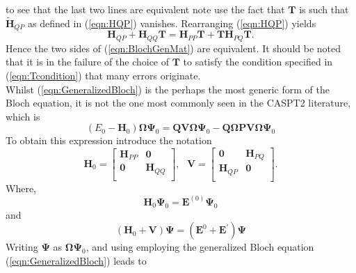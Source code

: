 \documentclass[12pt]{article}
\begin{document}
to see that the last two lines are equivalent note use the fact that $\mathbf{T}$ is such that $\tilde{\mathbf{H}}_{QP}$ 
as defined in (\ref{eqn:HQP}) vanishes. Rearranging (\ref{eqn:HQP}) yields 
\begin{equation*}
\mathbf{H}_{QP} + \mathbf{H}_{QQ}\mathbf{T} = \mathbf{\mathbf{H}}_{PP}\mathbf{T} + \mathbf{T}\mathbf{H}_{PQ}\mathbf{T}.
\label{eqn:Tcondition}
\end{equation*}
Hence the two sides of (\ref{eqn:BlochGenMat}) are equivalent. It should be noted that it is in the 
failure of the choice of $\mathbf{T}$ to satisfy the condition specified in (\ref{eqn:Tcondition}) 
that many errors originate.\\

\noindent Whilst (\ref{eqn:GeneralizedBloch}) is the perhaps the most generic form of the Bloch equation,
it is not the one most commonly seen in the CASPT2 literature, which is 
\begin{equation}
(E_{0} - \mathbf{H}_{0})\mathbf{\Omega} \boldsymbol{\Psi}_{0} =
 \mathbf{Q}\mathbf{V}\boldsymbol{\Omega}\boldsymbol{\Psi}_{0}- 
 \mathbf{Q}\boldsymbol{\Omega}\mathbf{P}\mathbf{V}\boldsymbol{\Omega}\boldsymbol{\Psi}_{0} 
\end{equation}
To obtain this expression introduce the notation
\begin{equation}
\mathbf{H}_{0}=
\begin{bmatrix}
\mathbf{H}_{PP} & \mathbf{0} \\
\mathbf{0} & \mathbf{H}_{QQ} \\
\end{bmatrix},
\text{ \ \ \ \ }
\mathbf{V} =
\begin{bmatrix}
\mathbf{0} & \mathbf{H}_{PQ} \\
\mathbf{H}_{QP} & \mathbf{0} \\
\end{bmatrix}.
\label{eqn:MatToAlgBloch}
\end{equation}
Where, 
\begin{equation}
\mathbf{H}_{0}\mathbf{\Psi}_{0} = \mathbf{E}^{(0)}\mathbf{\Psi}_{0}
\label{eqn:unperturbedHE}
\end{equation}
and 
\begin{equation}
(\mathbf{H}_{0}+\mathbf{V})\mathbf{\Psi} = (\mathbf{E}^{0}+\mathbf{E}^{'})\mathbf{\Psi}
\label{eqn:perturbedHE}
\end{equation}
Writing $\boldsymbol{\Psi}$ as $\boldsymbol{\Omega}\boldsymbol{\Psi}_{0}$, and using employing the generalized Bloch equation (\ref{eqn:GeneralizedBloch}) leads to
\end{document}

